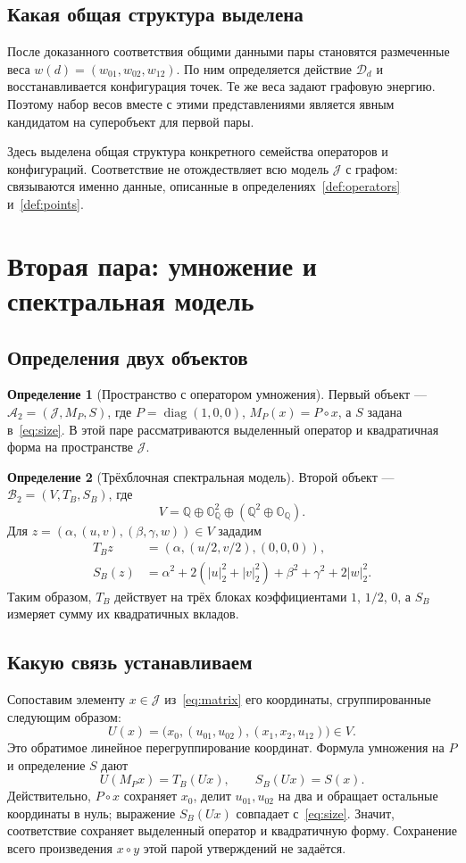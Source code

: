 \documentclass[11pt,a4paper]{article}
\numberwithin{equation}{section}
\theoremstyle{definition}
\newtheorem{definition}{Определение}
\theoremstyle{remark}
\newcommand{\QQ}{\mathbb{Q}}
\newcommand{\OO}{\mathbb{O}_{\QQ}}
\newcommand{\J}{\mathcal{J}}
\newcommand{\D}{\mathcal{D}}
\newcommand{\diag}{\operatorname{diag}}
\begin{document}
\subsection{Какая общая структура выделена}
После доказанного соответствия общими данными пары становятся
размеченные веса $w(d)=(w_{01},w_{02},w_{12})$.
По ним определяется действие $\D_d$ и восстанавливается конфигурация
точек. Те же веса задают графовую энергию. Поэтому набор весов
вместе с этими представлениями является явным кандидатом на
суперобъект для первой пары.

Здесь выделена общая структура конкретного семейства операторов
и конфигураций. Соответствие не отождествляет всю модель $\J$
с графом: связываются именно данные, описанные в
определениях~\ref{def:operators} и~\ref{def:points}.

\section{Вторая пара: умножение и спектральная модель}\label{sec:spectral}
\subsection{Определения двух объектов}
\begin{definition}[Пространство с оператором умножения]\label{def:multiplication}
Первый объект --- $\mathcal A_2=(\J,M_P,S)$, где
$P=\diag(1,0,0)$, $M_P(x)=P\circ x$, а $S$ задана
в~\eqref{eq:size}. В этой паре рассматриваются выделенный оператор
и квадратичная форма на пространстве $\J$.
\end{definition}

\begin{definition}[Трёхблочная спектральная модель]\label{def:spectral}
Второй объект --- $\mathcal B_2=(V,T_B,S_B)$, где
\[
 V=\QQ\oplus\OO^2\oplus(\QQ^2\oplus\OO).
\]
Для $z=(\alpha,(u,v),(\beta,\gamma,w))\in V$ зададим
\begin{align*}
 T_Bz&=(\alpha,(u/2,v/2),(0,0,0)),\\
 S_B(z)&=\alpha^2+2(|u|_2^2+|v|_2^2)
       +\beta^2+\gamma^2+2|w|_2^2.
\end{align*}
Таким образом, $T_B$ действует на трёх блоках коэффициентами
$1$, $1/2$, $0$, а $S_B$ измеряет сумму их квадратичных вкладов.
\end{definition}

\subsection{Какую связь устанавливаем}
Сопоставим элементу $x\in\J$ из~\eqref{eq:matrix} его координаты,
сгруппированные следующим образом:
\[
 U(x)=\bigl(x_0,(u_{01},u_{02}),(x_1,x_2,u_{12})\bigr)\in V.
\]
Это обратимое линейное перегруппирование координат. Формула умножения на $P$
и определение $S$ дают
\[
 U(M_Px)=T_B(Ux),\qquad S_B(Ux)=S(x).
\]
Действительно, $P\circ x$ сохраняет $x_0$, делит $u_{01},u_{02}$
на два и обращает остальные координаты в нуль; выражение $S_B(Ux)$
совпадает с~\eqref{eq:size}. Значит, соответствие сохраняет выделенный
оператор и квадратичную форму. Сохранение всего произведения
$x\circ y$ этой парой утверждений не задаётся.
\end{document}
